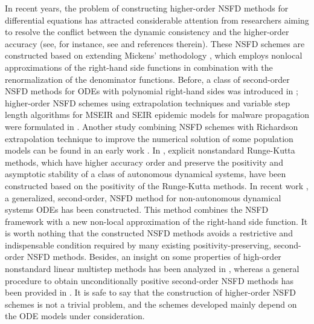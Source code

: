 \documentclass[12pt]{article}
\theoremstyle{definition}
\theoremstyle{remark}
\numberwithin{equation}{section}
\begin{document}
In recent years, the problem of constructing higher-order NSFD methods for differential equations has attracted considerable attention from researchers aiming to resolve the conflict between the dynamic consistency and the higher-order accuracy (see, for instance, see \cite{Alalhareth1, Alalhareth2, Hoang1, Hoang2, Hoang3, HoangMatthias1, HoangMatthias2, Kojouharov1} and references therein). These NSFD schemes are constructed based on extending Mickens' methodology \cite{Mickens1, Mickens2, Mickens3, Mickens4, Mickens5}, which employs nonlocal approximations of the right-hand side functions in combination with the renormalization of the denominator functions. Before, a class of second-order NSFD methods for ODEs with polynomial right-hand sides was introduced in \cite{Chen-Charpentier}; higher-order NSFD schemes using extrapolation techniques and variable step length algorithms for MSEIR and  SEIR epidemic models for malware propagation were formulated in \cite{Martin-Vaquero1, Martin-Vaquero2}. Another study combining NSFD schemes with Richardson extrapolation technique to improve the numerical solution of some population models can be found in an early work \cite{GParra}. In \cite{DangHoang}, explicit nonstandard Runge-Kutta methods, which have higher accuracy order and preserve the positivity and asymptotic stability of a class of autonomous dynamical systems, have been constructed based on the positivity of the Runge-Kutta methods. In recent work \cite{HoangMatthias2026},  a generalized, second-order, NSFD method for non-autonomous dynamical systems ODEs has been constructed. This method combines the NSFD framework with a new non-local approximation of the right-hand side function. It is worth nothing that the constructed NSFD methods avoids a restrictive and indispensable condition required by many existing positivity-preserving, second-order NSFD methods. Besides, an insight on some properties of high-order nonstandard linear multistep methods has been analyzed in \cite{Takacs}, whereas a general procedure to obtain unconditionally positive second-order NSFD methods has been provided in \cite{Conte}. It is safe to say that the construction of higher-order NSFD schemes is not a trivial problem, and the schemes developed mainly depend on the ODE models under consideration.
\end{document}
